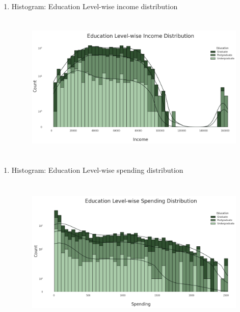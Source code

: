 \documentclass[11pt]{article}
\begin{document}
\vspace{1\baselineskip}
\begin{enumerate}
	\item Histogram: Education Level-wise income distribution

\begin{figure}[H]
\centering
\includegraphics[width=12.9cm,height=7.11cm]{./images/image25.png}
\end{figure}


\end{enumerate}
\vspace{1\baselineskip}
\begin{enumerate}
	\item Histogram: Education Level-wise spending distribution

\begin{figure}[H]
\centering
\includegraphics[width=13.16cm,height=7.24cm]{./images/image33.png}
\end{figure}


\end{enumerate}
\vspace{1\baselineskip}
\end{document}
